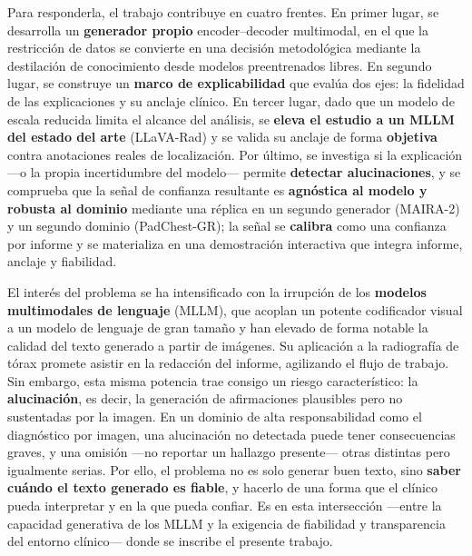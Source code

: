 Para responderla, el trabajo contribuye en cuatro frentes. En primer lugar, se desarrolla un
\textbf{generador propio} encoder--decoder multimodal, en el que la restricción de datos se
convierte en una decisión metodológica mediante la destilación de conocimiento desde modelos
preentrenados libres. En segundo lugar, se construye un \textbf{marco de explicabilidad} que
evalúa dos ejes: la fidelidad de las explicaciones y su anclaje clínico. En tercer lugar, dado que
un modelo de escala reducida limita el alcance del análisis, se \textbf{eleva el estudio a un MLLM
del estado del arte} (LLaVA-Rad) y se valida su anclaje de forma \textbf{objetiva} contra
anotaciones reales de localización. Por último, se investiga si la explicación —o la propia
incertidumbre del modelo— permite \textbf{detectar alucinaciones}, y se comprueba que la señal de
confianza resultante es \textbf{agnóstica al modelo y robusta al dominio} mediante una réplica en un
segundo generador (MAIRA-2) y un segundo dominio (PadChest-GR); la señal se \textbf{calibra} como una
confianza por informe y se materializa en una demostración interactiva que integra informe, anclaje y
fiabilidad.

El interés del problema se ha intensificado con la irrupción de los \textbf{modelos multimodales de
lenguaje} (MLLM), que acoplan un potente codificador visual a un modelo de lenguaje de gran tamaño y
han elevado de forma notable la calidad del texto generado a partir de imágenes. Su aplicación a la
radiografía de tórax promete asistir en la redacción del informe, agilizando el flujo de trabajo. Sin
embargo, esta misma potencia trae consigo un riesgo característico: la \textbf{alucinación}, es decir,
la generación de afirmaciones plausibles pero no sustentadas por la imagen. En un dominio de alta
responsabilidad como el diagnóstico por imagen, una alucinación no detectada puede tener consecuencias
graves, y una omisión —no reportar un hallazgo presente— otras distintas pero igualmente serias. Por
ello, el problema no es solo generar buen texto, sino \textbf{saber cuándo el texto generado es
fiable}, y hacerlo de una forma que el clínico pueda interpretar y en la que pueda confiar. Es en esta
intersección —entre la capacidad generativa de los MLLM y la exigencia de fiabilidad y transparencia
del entorno clínico— donde se inscribe el presente trabajo.

